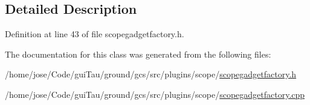 \subsection{Detailed Description}


Definition at line 43 of file scopegadgetfactory.\-h.



The documentation for this class was generated from the following files\-:\begin{DoxyCompactItemize}
\item 
/home/jose/\-Code/gui\-Tau/ground/gcs/src/plugins/scope/\hyperlink{scopegadgetfactory_8h}{scopegadgetfactory.\-h}\item 
/home/jose/\-Code/gui\-Tau/ground/gcs/src/plugins/scope/\hyperlink{scopegadgetfactory_8cpp}{scopegadgetfactory.\-cpp}\end{DoxyCompactItemize}
